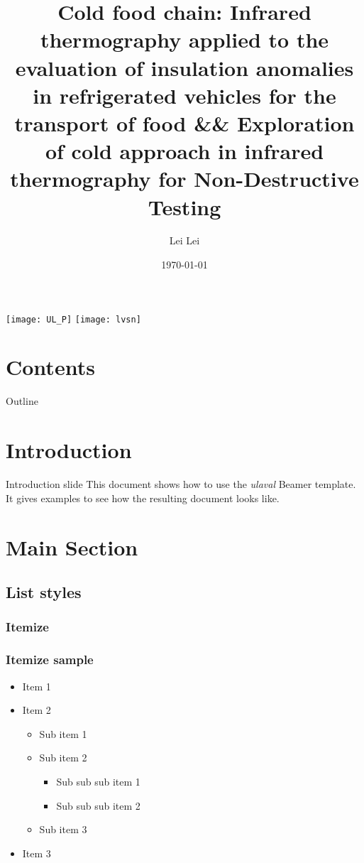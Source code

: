 \documentclass{beamer}
\title[Cold food chain-IRT application]{Cold food chain: Infrared thermography applied to the evaluation of insulation anomalies in refrigerated vehicles for the transport of food \&\& Exploration of cold approach in infrared thermography for Non-Destructive Testing}
\author[Lei Lei]{Lei Lei}
\institute[Université Laval]
{
	Electrical and Computer Engineering Department \\
	Laval University, Quebec City, Canada \\
	\medskip
}
\date{\today} %
\begin{document}
\begin{frame}[label=titre, plain]
	\titlepage
	\begin{center}\texttt{[image: UL\_P]}%
		\hspace{2cm}\texttt{[image: lvsn]}\end{center}
\end{frame}


\section*{Contents}

\begin{frame}[label=toc]{Outline}
	\setlength{\leftskip}{5cm}%
	\tableofcontents[subsectionstyle=show]
\end{frame}


\section{Introduction}


\begin{frame}[label=intro]{Introduction slide}
	This document shows how to use the \emph{ulaval} Beamer template.
	It gives examples to see how the resulting document looks like.
\end{frame}

\section{Main Section}

\subsection{List styles}

\subsubsection{Itemize}

\begin{frame}[label=itemize]\frametitle{Itemize sample} 
	\begin{itemize}
		\item Item 1
		\item Item 2
		\begin{itemize}
			\item Sub item 1
			\item Sub item 2
			\begin{itemize}
				\item Sub sub sub item 1
				\item Sub sub sub item 2
			\end{itemize}
			\item Sub item 3
		\end{itemize}
		\item Item 3
	\end{itemize}
\end{frame}
\end{document}

